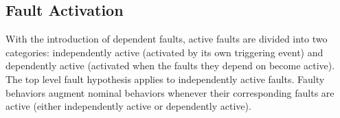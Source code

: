 \subsection{Fault Activation}
With the introduction of dependent faults, active faults are divided into two categories: independently active (activated by its own triggering event) and dependently active (activated when the faults they depend on become active). The top level fault hypothesis applies to independently active faults. Faulty behaviors augment nominal behaviors whenever their corresponding faults are active (either independently active or dependently active). 









